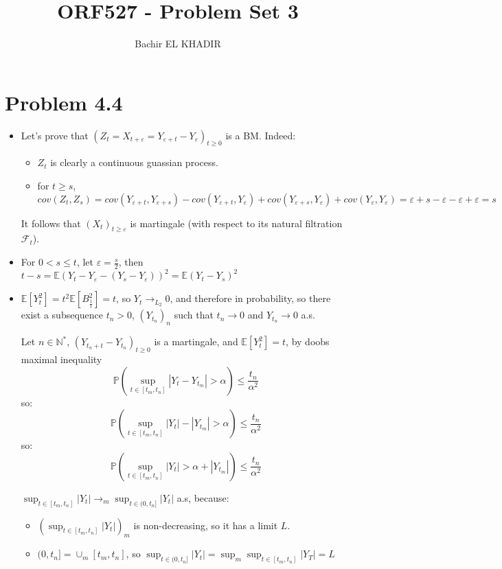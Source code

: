\documentclass[12pt]{article}
\title{ORF527 - Problem Set 3}
\author{Bachir EL KHADIR }
\newcommand{\esp}{{\mathbb E}}
\newcommand{\pr}{{\mathbb P}}
\newenvironment{problem}[1]
{\section*{Problem #1}}{}
\begin{document}
\maketitle


\begin{problem}{4.4}
  \begin{itemize}
    
  \item

    Let's prove that $(Z_t = X_{t + \varepsilon} = Y_{\varepsilon + t} - Y_{\varepsilon})_{t \ge 0}$ is a BM. Indeed:
    \begin{itemize}
    \item $Z_t$ is clearly a continuous guassian process.
    \item for $t \ge s$, $cov(Z_t, Z_s) = cov(Y_{\varepsilon + t}, Y_{\varepsilon + s}) -  cov(Y_{\varepsilon + t}, Y_{\varepsilon}) + cov(Y_{\varepsilon + s}, Y_{\varepsilon}) + cov(Y_{\varepsilon}, Y_{\varepsilon})= \varepsilon + s - \varepsilon - \varepsilon + \varepsilon  = s
      $
    \end{itemize}

    It follows that $(X_t)_{t \ge \varepsilon}$ is martingale (with respect to its natural filtration $\mathcal F_t$).
    
  \item For $0 < s \le t$, let $\varepsilon = \frac{s}2$, then $t - s = \esp( Y_t - Y_{\varepsilon} - ( Y_s - Y_{\varepsilon}) )^2 = \esp  (Y_t - Y_s)^2$
    

  \item

    $\esp[Y_t^2] = t^2 \esp[B_{\frac1t}^2] = t$, so $Y_t \rightarrow_{L_2} 0$, and therefore in probability, so there exist a subsequence $t_n > 0$, $(Y_{t_n})_n$ such that $t_n \rightarrow 0$ and $Y_{t_n} \rightarrow 0$ a.s.
    
    Let $n \in \mathbb N^*$, $(Y_{t_n + t}-Y_{t_n})_{t \ge 0}$ is a martingale, and $\esp[Y_t^2] = t$, by doobs maximal inequality
    $$\pr( \sup_{t \in [t_{m}, t_n]} |Y_t - Y_{t_{m}}| > \alpha) \le \frac{t_n}{\alpha^2}$$
    so:
    $$\pr( \sup_{t \in [t_{m}, t_n]} |Y_t| - |Y_{t_{m}}| > \alpha) \le \frac{t_n}{\alpha^2}$$
    so:
    $$\pr( \sup_{t \in [t_{m}, t_n]} |Y_t|  > \alpha + |Y_{t_m}|) \le \frac{t_n}{\alpha^2}$$
    
    $\sup_{t \in [t_{m}, t_n]} |Y_t|  \rightarrow_m \sup_{t \in (0, t_n]} |Y_t|$ a.s, because: 
    \begin{itemize}
    \item $(\sup_{t \in [t_{m}, t_n]} |Y_t|)_m$ is non-decreasing, so it has a limit $L$.      
    \item $(0, t_n] = \cup_m [t_m, t_n]$, so $\sup_{t \in (0, t_n]} |Y_t| = \sup_m \sup_{t \in [t_{m}, t_n]} |Y_T| = L$
    \end{itemize}


\end{itemize}
\end{problem}
\end{document}
